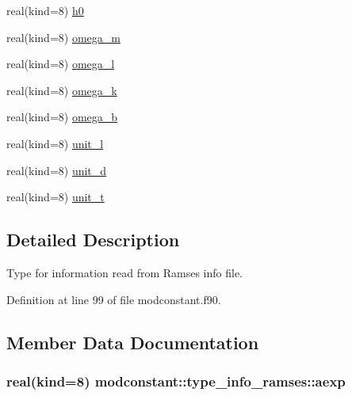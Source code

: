 \begin{DoxyCompactItemize}
\item 
real(kind=8) \hyperlink{structmodconstant_1_1type__info__ramses_a6ef180334ca74ac1ed2aaf84938ed4a7}{h0}
\item 
real(kind=8) \hyperlink{structmodconstant_1_1type__info__ramses_a77106df82f929843d1effa4dbb30ca50}{omega\-\_\-m}
\item 
real(kind=8) \hyperlink{structmodconstant_1_1type__info__ramses_abcae4797c8ecb670ee829c1fa7c75ee5}{omega\-\_\-l}
\item 
real(kind=8) \hyperlink{structmodconstant_1_1type__info__ramses_a48a40eea37a04b57ac5ec74b0dc7c7fd}{omega\-\_\-k}
\item 
real(kind=8) \hyperlink{structmodconstant_1_1type__info__ramses_a32632cab5a6f3cd851bdd10da410a093}{omega\-\_\-b}
\item 
real(kind=8) \hyperlink{structmodconstant_1_1type__info__ramses_a28474b9ed9a3749e1fff779f23233677}{unit\-\_\-l}
\item 
real(kind=8) \hyperlink{structmodconstant_1_1type__info__ramses_ab9cc0d348b8bebd2f004672e175a4677}{unit\-\_\-d}
\item 
real(kind=8) \hyperlink{structmodconstant_1_1type__info__ramses_ac057f8f4a9ab22cac7b786b5d9d869b6}{unit\-\_\-t}
\end{DoxyCompactItemize}


\subsection{Detailed Description}
Type for information read from Ramses info file. 

Definition at line 99 of file modconstant.\-f90.



\subsection{Member Data Documentation}
\hypertarget{structmodconstant_1_1type__info__ramses_aa5bf5f6d4b93838d3afe609352e84640}{
\subsubsection[{aexp}]{\setlength{\rightskip}{0pt plus 5cm}real(kind=8) modconstant\-::type\-\_\-info\-\_\-ramses\-::aexp}}\label{structmodconstant_1_1type__info__ramses_aa5bf5f6d4b93838d3afe609352e84640}


